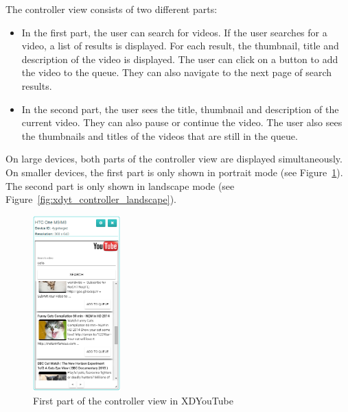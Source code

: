 The controller view consists of two different parts:
\begin{itemize}
	\item In the first part, the user can search for videos. If the user searches for a video, a list of results is displayed. For each result, the thumbnail, title and description of the video is displayed. The user can click on a button to add the video to the queue. They can also navigate to the next page of search results.
	\item In the second part, the user sees the title, thumbnail and description of the current video. They can also pause or continue the video. The user also sees the thumbnails and titles of the videos that are still in the queue. 
\end{itemize}

On large devices, both parts of the controller view are displayed simultaneously. On smaller devices, the first part is only shown in portrait mode (see Figure~\ref{fig:xdyt_controller_portrait}). The second part is only shown in landscape mode (see Figure~\ref{fig:xdyt_controller_landscape}).

\begin{figure}[h!]
  \centering
    \includegraphics[width=0.3\textwidth]{images/screenshots/xdyt/controller_portrait_2.png}
	\caption[Screenshot XDYouTube: Controller view (first part)]{First part of the controller view in XDYouTube}
	\label{fig:xdyt_controller_portrait}
\end{figure}

